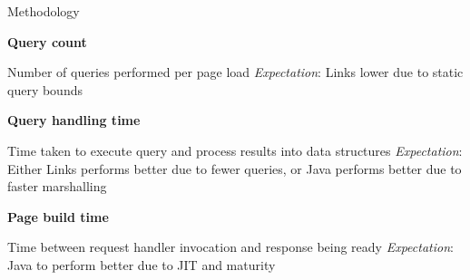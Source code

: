 \documentclass[11.5pt, aspectratio=169]{beamer}
\begin{document}

\begin{frame}{Methodology}

  \begin{fullpageitemize}
  \item<1->{\Large \textbf{Query count} }
    \begin{itemize}
      \itemR Number of queries performed per page load
      \itemR \emph{Expectation}: Links lower due to static query bounds
    \end{itemize}
    \vspace{1em}
  \item<2->{\Large \textbf{Query handling time} }
    \begin{itemize}
      \itemR Time taken to execute query and process results into data
        structures
      \itemR \emph{Expectation}: Either Links performs better due to fewer queries, or
        Java performs better due to faster marshalling
    \end{itemize}
    \vspace{1em}
  \item<3->{\Large \textbf{Page build time} }
    \begin{itemize}
      \itemR Time between request handler invocation and response being ready
      \itemR \emph{Expectation}: Java to perform better due to JIT and maturity
    \end{itemize}
  \end{fullpageitemize}
    \vspace{1em}

\end{frame}
\end{document}
